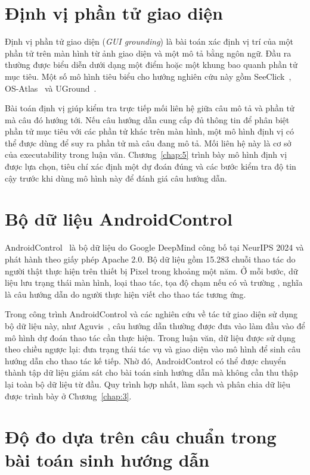 \section{Định vị phần tử giao diện}\label{sec:2.4}

Định vị phần tử giao diện (\emph{GUI grounding}) là bài toán xác định vị trí của một phần tử trên màn hình từ ảnh giao diện và một mô tả bằng ngôn ngữ. Đầu ra thường được biểu diễn dưới dạng một điểm hoặc một khung bao quanh phần tử mục tiêu. Một số mô hình tiêu biểu cho hướng nghiên cứu này gồm SeeClick~\cite{seeclick}, OS-Atlas~\cite{osatlas} và UGround~\cite{uground}.

Bài toán định vị giúp kiểm tra trực tiếp mối liên hệ giữa câu mô tả và phần tử mà câu đó hướng tới. Nếu câu hướng dẫn cung cấp đủ thông tin để phân biệt phần tử mục tiêu với các phần tử khác trên màn hình, một mô hình định vị có thể được dùng để suy ra phần tử mà câu đang mô tả. Mối liên hệ này là cơ sở của executability trong luận văn. Chương~\ref{chap:5} trình bày mô hình định vị được lựa chọn, tiêu chí xác định một dự đoán đúng và các bước kiểm tra độ tin cậy trước khi dùng mô hình này để đánh giá câu hướng dẫn.

\section{Bộ dữ liệu AndroidControl}\label{sec:2.5}

AndroidControl~\cite{androidcontrol} là bộ dữ liệu do Google DeepMind công bố tại NeurIPS 2024 và phát hành theo giấy phép Apache 2.0. Bộ dữ liệu gồm 15.283 chuỗi thao tác do người thật thực hiện trên thiết bị Pixel trong khoảng một năm. Ở mỗi bước, dữ liệu lưu trạng thái màn hình, loại thao tác, tọa độ chạm nếu có và trường , nghĩa là câu hướng dẫn do người thực hiện viết cho thao tác tương ứng.

Trong công trình AndroidControl và các nghiên cứu về tác tử giao diện sử dụng bộ dữ liệu này, như Aguvis~\cite{aguvis}, câu hướng dẫn thường được đưa vào làm đầu vào để mô hình dự đoán thao tác cần thực hiện. Trong luận văn, dữ liệu được sử dụng theo chiều ngược lại: đưa trạng thái tác vụ và giao diện vào mô hình để sinh câu hướng dẫn cho thao tác kế tiếp. Nhờ đó, AndroidControl có thể được chuyển thành tập dữ liệu giám sát cho bài toán sinh hướng dẫn mà không cần thu thập lại toàn bộ dữ liệu từ đầu. Quy trình hợp nhất, làm sạch và phân chia dữ liệu được trình bày ở Chương~\ref{chap:3}.

\section{Độ đo dựa trên câu chuẩn trong bài toán sinh hướng dẫn}\label{sec:2.6}

